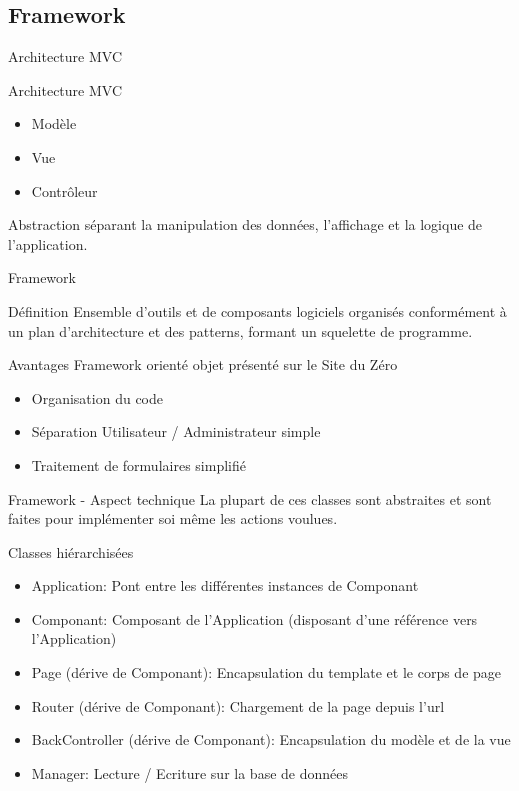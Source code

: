 \subsection{Framework}
\begin{frame}{Architecture MVC}
    \begin{block}{Architecture MVC}
    \begin{itemize}
    \item Modèle
    \item Vue
    \item Contrôleur
    \end{itemize}
    Abstraction séparant la manipulation des données, l'affichage et la logique de l'application.
    \end{block}
\end{frame}

\begin{frame}{Framework}
    \begin{block}{Définition}
    Ensemble d'outils et de composants logiciels organisés conformément à un plan d'architecture et des patterns, formant un squelette de programme.
    \end{block}

    \begin{block}{Avantages}
    Framework orienté objet présenté sur le Site du Zéro
    \begin{itemize}
    \item Organisation du code
    \item Séparation Utilisateur / Administrateur simple
    \item Traitement de formulaires simplifié
    \end{itemize}
    \end{block}
\end{frame}

\begin{frame}{Framework - Aspect technique}
    La plupart de ces classes sont abstraites et sont faites pour implémenter soi même les actions voulues.
    \begin{block}{Classes hiérarchisées}
    \begin{itemize}
    \item Application: Pont entre les différentes instances de Componant
    \item Componant: Composant de l'Application (disposant d'une référence vers l'Application)
    \item Page (dérive de Componant): Encapsulation du template et le corps de page
    \item Router (dérive de Componant): Chargement de la page depuis l'url
    \item BackController (dérive de Componant): Encapsulation du modèle et de la vue
    \item Manager: Lecture / Ecriture sur la base de données
    \end{itemize}
    \end{block}
\end{frame}

